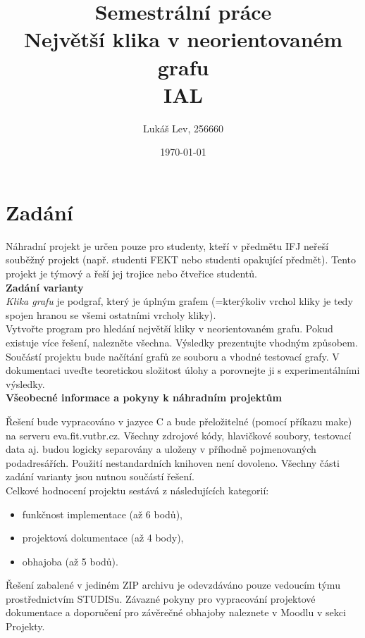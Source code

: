 \documentclass[a4paper]{article}
\title{\textbf{Semestrální práce}\\Největší klika v neorientovaném grafu\\[5pt]IAL}
\author{Lukáš Lev, 256660}
\date{\today}
\begin{document}
\maketitle
\newpage

\section{Zadání} \label{sec:zadani}
    Náhradní projekt je určen pouze pro studenty, kteří v předmětu IFJ neřeší souběžný projekt (např. studenti FEKT nebo studenti opakující předmět). Tento projekt je týmový a řeší jej trojice nebo čtveřice studentů.\\
    
    \noindent
    \textbf{Zadání varianty}\\
    \textit{Klika grafu} je podgraf, který je úplným grafem (=kterýkoliv vrchol kliky je tedy spojen hranou se všemi ostatními vrcholy kliky).\\
    \noindent
    Vytvořte program pro hledání největší kliky v neorientovaném grafu. Pokud existuje více řešení, nalezněte všechna. Výsledky prezentujte vhodným způsobem. Součástí projektu bude načítání grafů ze souboru a vhodné testovací grafy. V dokumentaci uveďte teoretickou složitost úlohy a porovnejte ji s experimentálními výsledky.\\
    
    \noindent
    \textbf{Všeobecné informace a pokyny k náhradním projektům}
    
    \noindent
    Řešení bude vypracováno v jazyce C a bude přeložitelné (pomocí příkazu make) na serveru eva.fit.vutbr.cz. Všechny zdrojové kódy, hlavičkové soubory, testovací data aj. budou logicky separovány a uloženy v příhodně pojmenovaných podadresářích. Použití nestandardních knihoven není dovoleno. Všechny části zadání varianty jsou nutnou součástí řešení.\\
    
    \noindent
    Celkové hodnocení projektu sestává z následujících kategorií:
    \begin{itemize}
        \item funkčnost implementace (až 6 bodů),
        \item projektová dokumentace (až 4 body),
        \item obhajoba (až 5 bodů).
    \end{itemize}
    
    \noindent
    Řešení zabalené v jediném ZIP archivu je odevzdáváno pouze vedoucím týmu prostřednictvím STUDISu. Závazné pokyny pro vypracování projektové dokumentace a doporučení pro závěrečné obhajoby naleznete v Moodlu v sekci Projekty.
    
\end{document}
